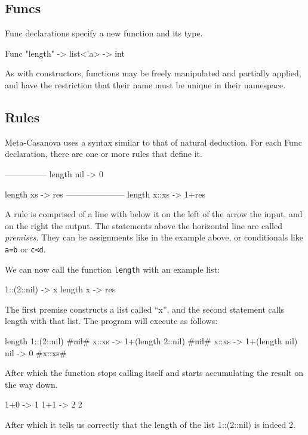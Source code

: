   \subsection{Funcs}
  Func declarations specify a new function and its type.

  \begin{code}
  Func "length" -> list<'a> -> int
  \end{code}

  As with constructors, functions may be freely manipulated and partially applied, and have the restriction that their name must be unique in their namespace.

  \subsection{Rules}
  Meta-Casanova uses a syntax similar to that of natural deduction.
  For each Func declaration, there are one or more rules that define it.

  \begin{code}
  ---------------
  length nil -> 0

  length xs -> res
  ---------------------
  length x::xs -> 1+res
  \end{code}
  
  A rule is comprised of a line with below it on the left of the arrow the input, and on the right the output.
  The statements above the horizontal line are called \textit{premises}.
  They can be assignments like in the example above, or conditionals like \verb|a=b| or \verb|c<d|.

  We can now call the function \verb|length| with an example list:

  \begin{code}
    1::(2::nil) -> x
    length x    -> res
  \end{code}

  The first premise constructs a list called ``x'', and the second statement calls length with that list.
  The program will execute as follows:

  \begin{code}
  length 1::(2::nil)
      #\st{nil}#
      x::xs -> 1+(length 2::nil)
          #\st{nil}#
          x::xs -> 1+(length nil)
              nil -> 0
              #\st{x::xs}#
  \end{code}

  \noindent
  After which the function stops calling itself and starts accumulating the result on the way down.
  
  \begin{code}
         1+0 -> 1
     1+1 -> 2
  2
  \end{code}

  \noindent
  After which it tells us correctly that the length of the list 1::(2::nil) is indeed 2.
